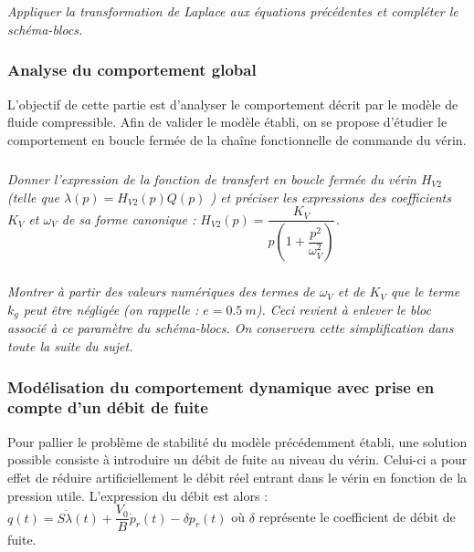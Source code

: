 \documentclass[10pt,fleqn]{article} %
\begin{document}
\begin{multicols}{2}
\subparagraph{}\textit{Appliquer la transformation de Laplace aux équations précédentes et compléter le schéma-blocs.}
\ifprof
\begin{corrige}
\end{corrige}
\else
\fi


\subsubsection*{Analyse du comportement global}

\begin{obj}
L’objectif de cette partie est d’analyser le comportement décrit par le modèle de fluide compressible. Afin de
valider le modèle établi, on se propose d’étudier le comportement en boucle fermée de la chaîne fonctionnelle de
commande du vérin.
\end{obj}






\subparagraph{}
\textit{Donner l’expression de la fonction de transfert en boucle fermée du vérin $H_{V2}$ (telle que $\lambda(p) =
H_{V2}(p) Q(p)$ ) et préciser les expressions des coefficients $K_V$ et $\omega_V$ de sa forme canonique :
$H_{V2}(p)=\dfrac{K_V}{p\left( 1+\dfrac{p^2}{\omega_V^2}\right)}$.}
\ifprof
\begin{corrige}
\end{corrige}
\else
\fi



\subparagraph{}
\textit{Montrer à partir des valeurs numériques des termes de $\omega_V$ et de $K_V$ que le terme $k_g$ peut être
négligée (on rappelle : $e = \SI{0.5}{m}$). Ceci revient à enlever le bloc associé à ce paramètre du schéma-blocs. On conservera cette simplification dans toute la suite du sujet.}
\ifprof
\begin{corrige}
\end{corrige}
\else
\fi




\subsubsection*{Modélisation du comportement dynamique avec prise en compte d'un débit de fuite}
Pour pallier le problème de stabilité du modèle précédemment établi, une solution possible consiste à introduire un débit de fuite au niveau du vérin. Celui-ci a pour effet de réduire artificiellement le débit réel entrant dans le vérin en fonction de la pression utile. L'expression du débit est alors : 
$q(t)=S\dot{\lambda}(t)+\dfrac{V_0}{B} \dot{p}_r(t)-\delta p_r(t)$ où $\delta$ représente le coefficient de débit de fuite.



\end{multicols}
\end{document}
